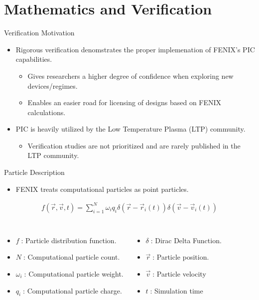 \documentclass[aspectratio=169, 16pt]{beamer}
\begin{document}
\section{Mathematics and Verification}

\begin{frame}{Verification Motivation}
  \vfill{}
  \begin{itemize}
    \item Rigorous verification denomstrates the proper implemenation of FENIX's PIC capabilities.
    \begin{itemize}
      \item Gives researchers a higher degree of confidence when exploring new devices/regimes.
      \item Enables an easier road for licensing of designs based on FENIX calculations.
    \end{itemize}
    \item PIC is heavily utilized by the Low Temperature Plasma (LTP) community.
    \begin{itemize}
      \item Verification studies are not prioritized and are rarely published in the LTP community\cite{alves2023foundations}.
    \end{itemize}
  \end{itemize}
\end{frame}

\begin{frame}{Particle Description}
    \vfill{}
    \begin{itemize}
      \item FENIX treats computational particles as point particles.
    \end{itemize}
    \begin{align}
      f \left( \vec{r}, \vec{v}, t \right) 
      =
      \sum_{i=1}^N 
      \omega_i q_i 
      \delta \left( \vec{r} - \vec{r}_i(t) \right)
      \delta \left( \vec{v} - \vec{v}_i(t) \right)
    \end{align}
    \begin{columns}
      \begin{itemize}
        \item $f\;$: Particle distribution function.
        \item $N\;$: Computational particle count. 
        \item $\omega_i\;$: Computational particle weight.
        \item $q_i\;$: Computational particle charge.
      \end{itemize} 
      \begin{itemize}
        \item $\delta\;$: Dirac Delta Function.
        \item $\vec{r}\;$: Particle position.
        \item $\vec{v}\;$: Particle velocity
        \item $t\;$: Simulation time
      \end{itemize}
    \end{columns}
\end{frame}
\end{document}
